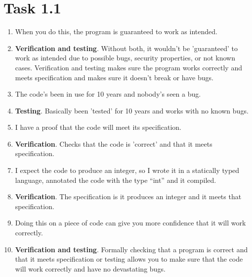\documentclass{article}
\author{\hmwkAuthorName}
\date{}
\newcommand{\answer}{\item[]} %
\begin{document}
	
	
	\section{Task 1.1}
	
		\begin{enumerate}[label={(\alph*)}]
			
			\item When you do this, the program is guaranteed to work as intended.
			\answer \textbf{Verification and testing}. Without both, it wouldn't be 'guaranteed' to work as intended due to possible bugs, security properties, or not known cases. Verification and testing makes sure the program works correctly and meets specification and makes sure it doesn't break or have bugs.
			
			\item The code’s been in use for 10 years and nobody’s seen a bug.
			\answer \textbf{Testing}. Basically been 'tested' for 10 years and works with no known bugs.
			
			\item I have a proof that the code will meet its specification.
			\answer \textbf{Verification}. Checks that the code is 'correct' and that it meets specification.
			
			\item I expect the code to produce an integer, so I wrote it in a statically typed language, annotated the code with the type “int” and it compiled.
			\answer \textbf{Verification}. The specification is it produces an integer and it meets that specification. 
			
			\item Doing this on a piece of code can give you more confidence that it will work correctly.
			\answer \textbf{Verification and testing}. Formally checking that a program is correct and that it meets specification or testing allows you to make sure that the code will work correctly and have no devastating bugs.
			
		\end{enumerate}
	
\end{document}
